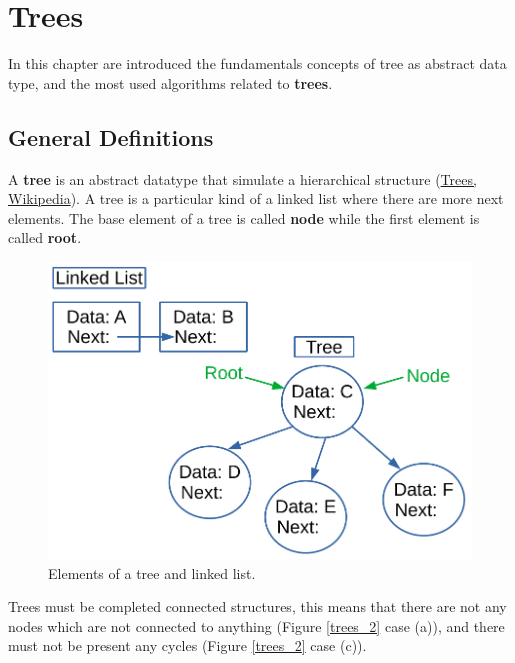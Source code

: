 \chapter{Trees}
\label{chp:trees}
In this chapter are introduced the fundamentals concepts of tree as abstract data type, and the most used algorithms related to \textbf{trees}.

\section{General Definitions}
A \textbf{tree} is an abstract datatype that simulate a hierarchical structure \cite{wikitrees} (\href{https://en.wikipedia.org/wiki/Tree_(data_structure)}{Trees, Wikipedia}). A tree is a particular kind of a linked list where there are more next elements. The base element of a tree is called \textbf{node} while the first element is called \textbf{root}.

\begin{figure}[H]
	\begin{center}
		\includegraphics[scale=.6]{chapters/trees/images/trees_1.pdf}
		\caption[Elements of a tree and linked list.]{Elements of a tree and linked list.}
		\label{trees_1}
	\end{center}
\end{figure}

Trees must be completed connected structures, this means that there are not any nodes which are not connected to anything (Figure \ref{trees_2} case (a)), and there must not be present any cycles (Figure \ref{trees_2} case (c)).


